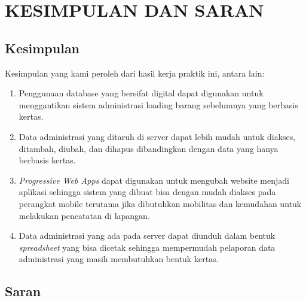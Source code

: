 \chapter{KESIMPULAN DAN SARAN}
\vspace{4ex}

\setlength{\parindent}{7ex}


\section{Kesimpulan}
\vspace{1ex}

Kesimpulan yang kami peroleh dari hasil kerja praktik ini, antara lain:
\vspace{0.5ex}

\begin{enumerate}[nolistsep]

  \item Penggunaan database yang bersifat digital dapat digunakan untuk menggantikan sistem administrasi loading barang sebelumnya yang berbasis kertas.
  \vspace{0.5ex}

  \item Data administrasi yang ditaruh di server dapat lebih mudah untuk diakses, ditambah, diubah, dan dihapus dibandingkan dengan data yang hanya berbasis kertas.
  \vspace{0.5ex}

  \item \emph{Progressive Web Apps} dapat digunakan untuk mengubah website menjadi aplikasi sehingga sistem yang dibuat bisa dengan mudah diakses pada perangkat mobile terutama jika dibutuhkan mobilitas dan kemudahan untuk melakukan pencatatan di lapangan.
  \vspace{0.5ex}

  \item Data administrasi yang ada pada server dapat diunduh dalam bentuk \emph{spreadsheet} yang bisa dicetak sehingga mempermudah pelaporan data administrasi yang masih membutuhkan bentuk kertas.
  \vspace{0.5ex}

\end{enumerate}
\vspace{0.5ex}

\section{Saran}
\vspace{1ex}


